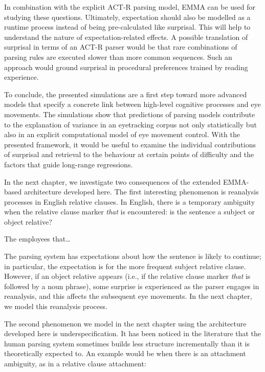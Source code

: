 \documentclass{cambridge7A}\usepackage[]{graphicx}\usepackage[]{color}
\begin{document}
In combination with the explicit ACT-R parsing model, EMMA can be used for studying these questions. 
Ultimately, expectation should also be modelled as a runtime process instead of being pre-calculated like surprisal. This will help to understand the nature of expectation-related effects. A possible translation of surprisal in terms of an ACT-R parser would be that rare combinations of parsing rules are executed slower than more common sequences. Such an approach would ground surprisal in procedural preferences trained by reading experience.

To conclude, the presented simulations are a first step toward more advanced models that specify a concrete link between high-level cognitive processes and eye movements.  The simulations show that predictions of parsing models contribute to the explanation of variance in an eyetracking corpus not only statistically but also in an explicit computational model of eye movement control.  
With the presented framework, it would be useful to examine the individual contributions of surprisal and retrieval to the behaviour at certain points of difficulty and the factors that guide long-range regressions.

In the next chapter, we investigate two consequences of the extended EMMA-based architecture developed here. The first interesting phenomenon is reanalysis processes in English relative clauses. In English, there is a temporary ambiguity when the relative clause marker \textit{that} is encountered: is the sentence a subject or object relative? 

\begin{exe}
\ex
The employees that\dots
\end{exe}

The parsing system has expectations about how the sentence is likely to continue; in particular, the expectation is for the more frequent subject relative clause. However, if an object relative appears (i.e., if the relative clause marker \textit{that} is followed by a noun phrase), some surprise is experienced as the parser engages in reanalysis, and this affects the subsequent eye movements. In the next chapter, we model this reanalysis process.

The second phenomenon we model in the next chapter using the architecture developed here is underspecification. It has been noticed in the literature that the human parsing system sometimes builds less structure incrementally than it is theoretically expected to. An example would be when there is an attachment ambiguity, as in a relative clause attachment:
\end{document}
